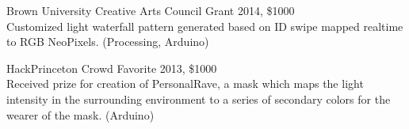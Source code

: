 Brown University Creative Arts Council Grant 2014, \$1000 \\
Customized light waterfall pattern generated based on ID swipe mapped realtime to RGB NeoPixels. (Processing, Arduino)

HackPrinceton Crowd Favorite 2013, \$1000 \\
Received prize for creation of PersonalRave, a mask which maps the light intensity in the surrounding environment to a series of secondary colors for the wearer of the mask. (Arduino)









 

